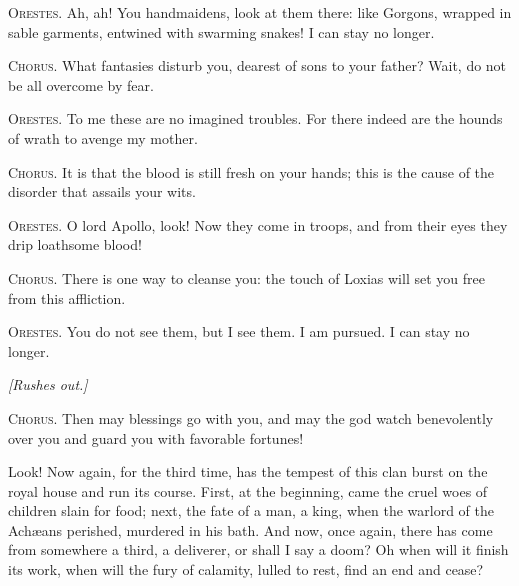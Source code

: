 \documentclass[12pt]{article}
\begin{document}
\textsc{Orestes.} Ah, ah! You handmaidens, look at them there: like Gorgons, wrapped in sable garments, entwined with swarming snakes! I can stay no longer.

\textsc{Chorus.} What fantasies disturb you, dearest of sons to your father? Wait, do not be all overcome by fear.

\textsc{Orestes.} To me these are no imagined troubles. For there indeed are the hounds of wrath to avenge my mother.

\textsc{Chorus.} It is that the blood is still fresh on your hands; this is the cause of the disorder that assails your wits.

\textsc{Orestes.} O lord Apollo, look! Now they come in troops, and from their eyes they drip loathsome blood!

\textsc{Chorus.} There is one way to cleanse you: the touch of Loxias will set you free from this affliction.

\textsc{Orestes.} You do not see them, but I see them. I am pursued. I can stay no longer.

\begin{center}
\textit{[Rushes out.]}
\end{center}

\textsc{Chorus.} Then may blessings go with you, and may the god watch benevolently over you and guard you with favorable fortunes!

Look! Now again, for the third time, has the tempest of this clan burst on the royal house and run its course. First, at the beginning, came the cruel woes of children slain for food; next, the fate of a man, a king, when the warlord of the Ach{\ae}ans perished, murdered in his bath. And now, once again, there has come from somewhere a third, a deliverer, or shall I say a doom? Oh when will it finish its work, when will the fury of calamity, lulled to rest, find an end and cease?
\end{document}
